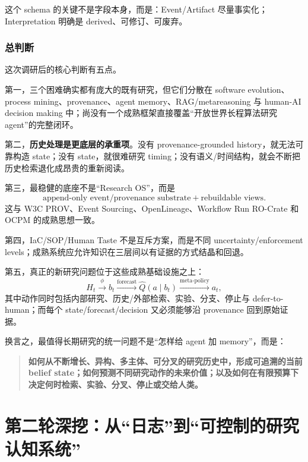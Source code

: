 \documentclass[11pt,a4paper]{ctexart}
\begin{document}
这个 schema 的关键不是字段本身，而是：Event/Artifact 尽量事实化；Interpretation 明确是 derived、可修订、可废弃。

\section{总判断}

这次调研后的核心判断有五点。

第一，三个困难确实都有庞大的既有研究，但它们分散在 software evolution、process mining、provenance、agent memory、RAG/metareasoning 与 human-AI decision making 中；尚没有一个成熟框架直接覆盖“开放世界长程算法研究 agent”的完整闭环。

第二，\textbf{历史处理是更底层的承重项}。没有 provenance-grounded history，就无法可靠构造 state；没有 state，就很难研究 timing；没有语义/时间结构，就会不断把历史检索退化成昂贵的重新阅读。

第三，最稳健的底座不是“Research OS”，而是
\begin{equation}
\boxed{\text{append-only event/provenance substrate}+\text{rebuildable views}.}
\end{equation}
这与 W3C PROV、Event Sourcing、OpenLineage、Workflow Run RO-Crate 和 OCPM 的成熟思想一致。

第四，IaC/SOP/Human Taste 不是互斥方案，而是不同 uncertainty/enforcement levels；成熟系统应允许知识在三层间以有证据的方式结晶和回退。

第五，真正的新研究问题位于这些成熟基础设施之上：
\begin{equation}
\boxed{
H_t\xrightarrow{\phi}b_t
\xrightarrow{\text{forecast}}\hat Q(a\mid b_t)
\xrightarrow{\text{meta-policy}}a_t,
}
\end{equation}
其中动作同时包括内部研究、历史/外部检索、实验、分支、停止与 defer-to-human；而每个 state/forecast/decision 又必须能够沿 provenance 回到原始证据。

换言之，最值得长期研究的统一问题不是“怎样给 agent 加 memory”，而是：
\begin{quote}
\textbf{如何从不断增长、异构、多主体、可分叉的研究历史中，形成可追溯的当前 belief state；如何预测不同研究动作的未来价值；以及如何在有限预算下决定何时检索、实验、分叉、停止或交给人类。}
\end{quote}


\part{第二轮深挖：从“日志”到“可控制的研究认知系统”}
\end{document}
